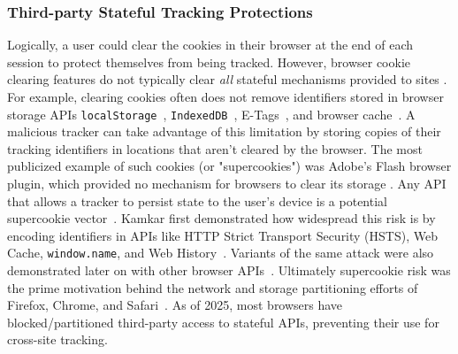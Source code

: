 \subsubsection{Third-party Stateful Tracking Protections}
\label{sec:stateful-defenses-evercookie}
Logically, a user could clear the cookies in their browser at the end of each session to protect themselves from being tracked. 
%
However, browser cookie clearing features do not typically clear \textit{all} stateful mechanisms provided to sites \cite{acarWebNeverForgets2014, englehardtOnlineTracking1millionsite2016}. 
%
For example, clearing cookies often does not remove identifiers stored in browser storage APIs \texttt{localStorage}~\cite{ayensonFlashCookiesPrivacy2011,roesnerDetectingDefendingThirdparty2012}, \texttt{IndexedDB}~\cite{acarFPDetectiveDustingWeb2013}, E-Tags~\cite{ayensonFlashCookiesPrivacy2011}, and browser cache~\cite{sorensenZombiecookiesCaseStudies2013}. 
%
A malicious tracker can take advantage of this limitation by storing copies of their tracking identifiers in locations that aren’t cleared by the browser. 
%
The most publicized example of such cookies (or "supercookies") was Adobe's Flash browser plugin, which provided no mechanism for browsers to clear its storage \cite{soltaniFlashCookiesPrivacy2009,solomosTalesFaviconsCaches2021}.
%
Any API that allows a tracker to persist state to the user’s device is a potential supercookie vector~\cite{aliNavigatingMurkyWaters2023}. 
%
%
Kamkar first demonstrated how widespread this risk is by encoding identifiers in APIs like HTTP Strict Transport Security (HSTS), Web Cache, \texttt{window.name}, and Web History~\cite{kamkarSamyKamkarEvercookie2010}. 
%
Variants of the same attack were also demonstrated later on with other browser APIs~\cite{klink1334485TrackingUsing2017,goodinUnpatchedBrowserWeaknesses2015,evansPublicKeyPinning2015}. 
%
Ultimately supercookie risk was the prime motivation behind the network and storage partitioning efforts of Firefox, Chrome, and Safari~\cite{menkeStorageIsolationProject2020,privacycommunitygroupClientSideStoragePartitioning2022,mdnStatePartitioningPrivacy2024}. 
%
As of 2025, most browsers have blocked/partitioned third-party access to stateful APIs, preventing their use for cross-site tracking.

